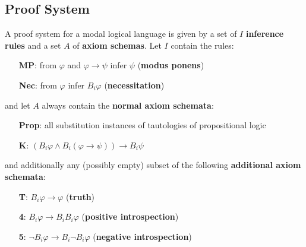 \documentclass[nobib,nofonts]{tufte-handout}
\renewcommand{\phi}{\ensuremath{\varphi}}
\newcommand{\ra}{\ensuremath{\rightarrow}}
\newcommand{\Bel}{\ensuremath{B}}
\begin{document}
\begin{example}
\begin{minipage}[t]{0.6\linewidth}
\begin{center}
    \end{center}
  \end{minipage}

\end{example}


\subsection{Proof System}
\label{sec:proof-system}

\begin{definition}
  A proof system for a modal logical language is given by a set of $I$
  \textbf{inference rules} and a set $A$ of \textbf{axiom
    schemas}. Let $I$ contain the rules:
  \begin{itemize}
  \item[\textbf{MP}:] from $\phi$ and $\phi \ra \psi$ infer $\psi$ \hfill (\textbf{modus ponens})
  \item[\textbf{Nec}:] from $\phi$ infer $\Bel_i \phi$ \hfill (\textbf{necessitation})
  \end{itemize}
  and let $A$ always contain the \textbf{normal axiom schemata}:
  \begin{itemize}
  \item[\textbf{Prop}:] all substitution instances of tautologies of propositional logic
  \item[\textbf{K}:] $(\Bel_i \phi \wedge \Bel_i (\phi \ra \psi)) \ra
    \Bel_i \psi$
  \end{itemize}
  and additionally any (possibly empty) subset of the following \textbf{additional axiom schemata}:
  \begin{itemize}
  \item[\textbf{T}:] $\Bel_i \phi \ra \phi$ \hfill (\textbf{truth})
  \item[\textbf{4}:] $\Bel_i \phi \ra \Bel_i \Bel_i \phi$ \hfill
    (\textbf{positive introspection})
  \item[\textbf{5}:] $\neg \Bel_i \phi \ra \Bel_i \neg \Bel_i \phi$ \hfill
    (\textbf{negative introspection})
  \end{itemize}
\end{definition}
\end{document}
